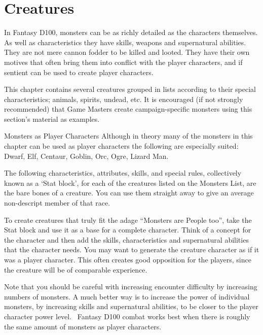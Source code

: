 \chapter{Creatures}
\label{ch:creatures}

In Fantasy D100, monsters can be as richly detailed as the characters themselves. As well as characteristics they have skills, weapons and supernatural abilities. They are not mere cannon fodder to be killed and looted. They have their own motives that often bring them into conflict with the player characters, and if sentient can be used to create player characters.

This chapter contains several creatures grouped in lists according to their special characteristics; animals, spirits, undead, etc. It is encouraged (if not strongly recommended) that Game Masters create campaign-specific monsters using this section's material as examples.
\vspace{1em}

\begin{rpg-titlebox}{Monsters as Player Characters}
Although in theory many of the monsters in this chapter can be used as player characters the following are especially suited: Dwarf, Elf, Centaur, Goblin, Orc, Ogre, Lizard Man.
\end{rpg-titlebox}
  
The following characteristics, attributes, skills, and special rules, collectively known as a ‘Stat block’, for each of the creatures listed on the Monsters List, are the bare bones of a creature. You can use them straight away to give an average non-descript member of that race.

To create creatures that truly fit the adage “Monsters are People too”, take the Stat block and use it as a base for a complete character. Think of a concept for the character and then add the skills, characteristics and supernatural abilities that the character needs. You may want to generate the creature character as if it was a player character. This often creates good opposition for the players, since the creature will be of comparable experience. 

Note that you should be careful with increasing encounter difficulty by increasing numbers of monsters. A much better way is to increase the power of individual monsters, by increasing skills and supernatural abilities, to be closer to the player character power level.  Fantasy D100 combat works best when there is roughly the same amount of monsters as player characters.


